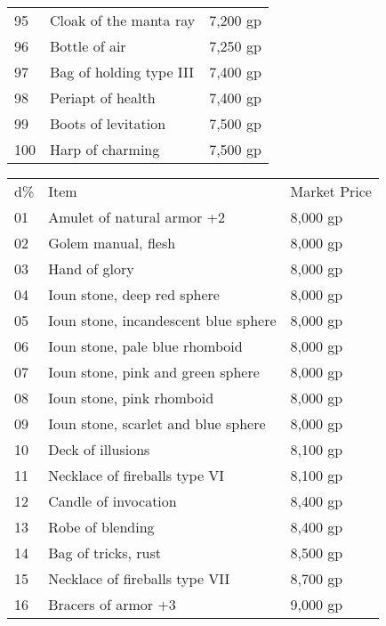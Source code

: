 \begin{xtabular}{lll}
95  & Cloak of the manta ray                      & 7,200 gp     \\
96  & Bottle of air                               & 7,250 gp     \\
97  & Bag of holding type III                     & 7,400 gp     \\
98  & Periapt of health                           & 7,400 gp     \\
99  & Boots of levitation                         & 7,500 gp     \\
100 & Harp of charming                            & 7,500 gp    
\end{xtabular}

\setlength{\tabcolsep}{1pt}
\begin{xtabular}{lll}
d\% & Item                                        & Market Price \\
01  & Amulet of natural armor +2                  & 8,000 gp     \\
02  & Golem manual, flesh                         & 8,000 gp     \\
03  & Hand of glory                               & 8,000 gp     \\
04  & Ioun stone, deep red sphere                 & 8,000 gp     \\
05  & Ioun stone, incandescent blue sphere        & 8,000 gp     \\
06  & Ioun stone, pale blue rhomboid              & 8,000 gp     \\
07  & Ioun stone, pink and green sphere           & 8,000 gp     \\
08  & Ioun stone, pink rhomboid                   & 8,000 gp     \\
09  & Ioun stone, scarlet and blue sphere         & 8,000 gp     \\
10  & Deck of illusions                           & 8,100 gp     \\
11  & Necklace of fireballs type VI               & 8,100 gp     \\
12  & Candle of invocation                        & 8,400 gp     \\
13  & Robe of blending                            & 8,400 gp     \\
14  & Bag of tricks, rust                         & 8,500 gp     \\
15  & Necklace of fireballs type VII              & 8,700 gp     \\
16  & Bracers of armor +3                         & 9,000 gp     \\

\end{xtabular}
